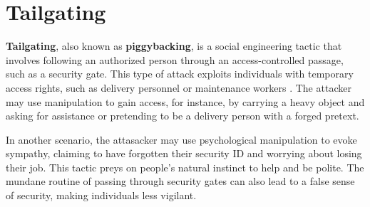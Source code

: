 
\section{Tailgating}


\textbf{Tailgating}, also known as \textbf{piggybacking}, is a social engineering tactic that involves following an authorized person through an access-controlled passage, such as a security gate. This type of attack exploits individuals with temporary access rights, such as delivery personnel or maintenance workers \citep{conteh_cybersecurityrisks_2016}. The attacker may use manipulation to gain access, for instance, by carrying a heavy object and asking for assistance or pretending to be a delivery person with a forged pretext.


In another scenario, the attasacker may use psychological manipulation to evoke sympathy, claiming to have forgotten their security ID and worrying about losing their job. This tactic preys on people's natural instinct to help and be polite. The mundane routine of passing through security gates can also lead to a false sense of security, making individuals less vigilant.














